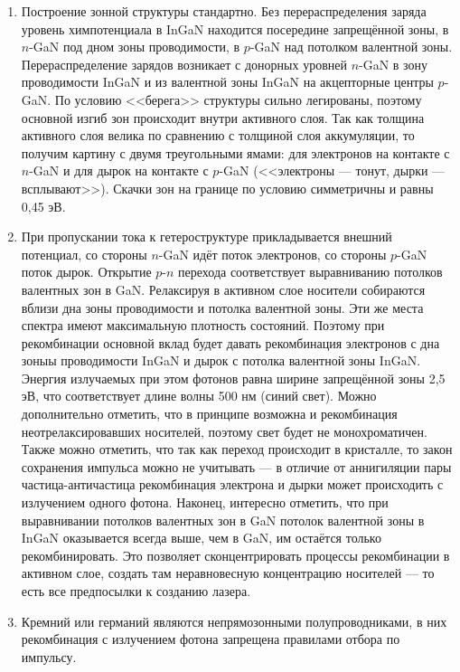 \documentclass[a4paper]{article}
\begin{document}
\begin{sol}
	\renewcommand{\labelenumi}{(\roman{enumi})}
\begin{enumerate}
\item Построение зонной структуры стандартно.
	Без перераспределения заряда уровень химпотенциала в InGaN находится посередине запрещённой зоны, в $n$-GaN под дном зоны проводимости, в 
	$p$-GaN  над потолком валентной зоны. Перераспределение зарядов возникает с донорных
уровней $n$-GaN в зону проводимости InGaN и из
валентной зоны InGaN на акцепторные центры $p$-GaN.
По условию <<берега>> структуры сильно легированы,
поэтому основной изгиб зон происходит внутри активного
слоя. Так как толщина активного слоя велика по
сравнению с толщиной слоя аккумуляции, то
получим картину с двумя треугольными ямами: для 
электронов на контакте с $n$-GaN и для дырок на
контакте с $p$-GaN (<<электроны --- тонут, дырки ---
всплывают>>). Скачки зон на границе по условию симметричны и равны 0,45 эВ.
\item При пропускании тока к гетероструктуре
	прикладывается внешний потенциал, со стороны
	$n$-GaN идёт поток электронов, со стороны
	$p$-GaN поток дырок. Открытие $p$-$n$ 
	перехода соответствует выравниванию
	потолков валентных зон в GaN.
	Релаксируя в активном слое носители собираются
	вблизи дна зоны проводимости и потолка
	валентной зоны. Эти же места спектра имеют
	максимальную плотность состояний. Поэтому
	при рекомбинации основной вклад будет давать
	рекомбинация электронов с дна зоныы
	проводимости InGaN и дырок с потолка валентной
	зоны InGaN. Энергия излучаемых при этом
	фотонов равна ширине запрещённой зоны 2,5 эВ,
	что соответствует длине волны 500 нм (синий свет). Можно дополнительно отметить, что в принципе
	возможна и рекомбинация неотрелаксировавших
	носителей, поэтому свет будет не
	монохроматичен. Также можно отметить, что
	так как переход происходит в кристалле, то
	закон сохранения импульса можно не учитывать
	--- в отличие от аннигиляции пары частица-античастица рекомбинация
	электрона и дырки может происходить с
	излучением одного фотона.
	Наконец, интересно отметить, что при выравнивании
	потолков валентных зон в  GaN потолок
	валентной зоны в InGaN оказывается всегда выше,
	чем в GaN, им остаётся только рекомбинировать.
	Это позволяет сконцентрировать процессы
	рекомбинации в активном слое, создать там
	неравновесную концентрацию  носителей --- то есть
	все предпосылки к созданию лазера.
\item Кремний или германий являются непрямозонными
полупроводниками, в них рекомбинация с излучением фотона
запрещена правилами отбора по импульсу.
\end{enumerate}
\end{sol}
\end{document}
